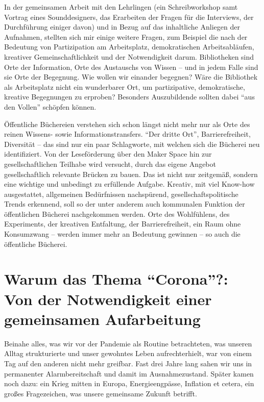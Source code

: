 \documentclass[a4paper,
fontsize=11pt,
oneside,
numbers=noperiodatend,
parskip=half-,
bibliography=totoc,
final
]{scrartcl}
\begin{document}
In der gemeinsamen Arbeit mit den Lehrlingen (ein Schreibworkshop samt
Vortrag eines Sounddesigners, das Erarbeiten der Fragen für die
Interviews, der Durchführung einiger davon) und in Bezug auf das
inhaltliche Anliegen der Aufnahmen, stellten sich mir einige weitere
Fragen, zum Beispiel die nach der Bedeutung von Partizipation am
Arbeitsplatz, demokratischen Arbeitsabläufen, kreativer
Gemeinschaftlichkeit und der Notwendigkeit darum. Bibliotheken sind Orte
der Information, Orte des Austauschs von Wissen -- und in jedem Falle
sind sie Orte der Begegnung. Wie wollen wir einander begegnen? Wäre die
Bibliothek als Arbeitsplatz nicht ein wunderbarer Ort, um partizipative,
demokratische, kreative Begegnungen zu erproben? Besonders Auszubildende
sollten dabei \enquote{aus den Vollen} schöpfen können.

Öffentliche Büchereien verstehen sich schon längst nicht mehr nur als
Orte des reinen Wissens- sowie Informationstransfers. \enquote{Der
dritte Ort}, Barrierefreiheit, Diversität -- das sind nur ein paar
Schlagworte, mit welchen sich die Bücherei neu identifiziert. Von der
Leseförderung über den Maker Space hin zur gesellschaftlichen Teilhabe
wird versucht, durch das eigene Angebot gesellschaftlich relevante
Brücken zu bauen. Das ist nicht nur zeitgemäß, sondern eine wichtige und
unbedingt zu erfüllende Aufgabe. Kreativ, mit viel Know-how
ausgestattet, allgemeinen Bedürfnissen nachspürend,
gesellschaftspolitische Trends erkennend, soll so der unter anderem auch
kommunalen Funktion der öffentlichen Bücherei nachgekommen werden. Orte
des Wohlfühlens, des Experiments, der kreativen Entfaltung, der
Barrierefreiheit, ein Raum ohne Konsumzwang -- werden immer mehr an
Bedeutung gewinnen -- so auch die öffentliche Bücherei.

\hypertarget{warum-das-thema-corona-von-der-notwendigkeit-einer-gemeinsamen-aufarbeitung}{%
\section{\texorpdfstring{Warum das Thema \enquote{Corona}?: Von
der Notwendigkeit einer gemeinsamen
Aufarbeitung}{Warum das Thema ``Corona''?: Von der Notwendigkeit einer gemeinsamen Aufarbeitung}}\label{warum-das-thema-corona-von-der-notwendigkeit-einer-gemeinsamen-aufarbeitung}}

Beinahe alles, was wir vor der Pandemie als Routine betrachteten, was
unseren Alltag strukturierte und unser gewohntes Leben aufrechterhielt,
war von einem Tag auf den anderen nicht mehr greifbar. Fast drei Jahre
lang sahen wir uns in permanenter Alarmbereitschaft und damit im
Ausnahmezustand. Später kamen noch dazu: ein Krieg mitten in Europa,
Energieengpässe, Inflation et cetera, ein großes Fragezeichen, was
unsere gemeinsame Zukunft betrifft.
\end{document}
